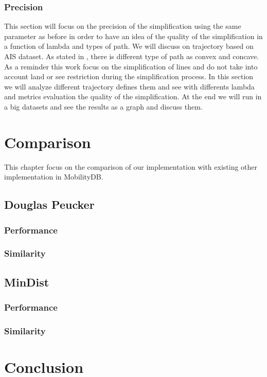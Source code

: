 \documentclass[twoside,12pt, a4paper]{report}
\begin{document}
\subsection{Precision}
This section will focus on the precision of the simplification using the same parameter as before in order to have an idea of the quality of the simplification in a function of lambda and types of path. We will discuss on trajectory based on AIS dataset. As stated in \cite{abam2007streaming}, there is different type of path as convex and concave. As a reminder this work focus on the simplification of lines and do not take into account land or see restriction during the simplification process. In this section we will analyze different trajectory defines them and see with differents lambda and metrics evaluation the quality of the simplification. At the end we will run in a big datasets and see the results as a graph and discuss them. 

\subsubsection{} 


\chapter{Comparison}
This chapter focus on the comparison of our implementation with existing other implementation in MobilityDB.

\section{Douglas Peucker}
\subsection{Performance}
\subsection{Similarity}

\section{MinDist}
\subsection{Performance}
\subsection{Similarity}

\chapter{Conclusion}

\newpage
\printbibliography
%
%
\end{document}
